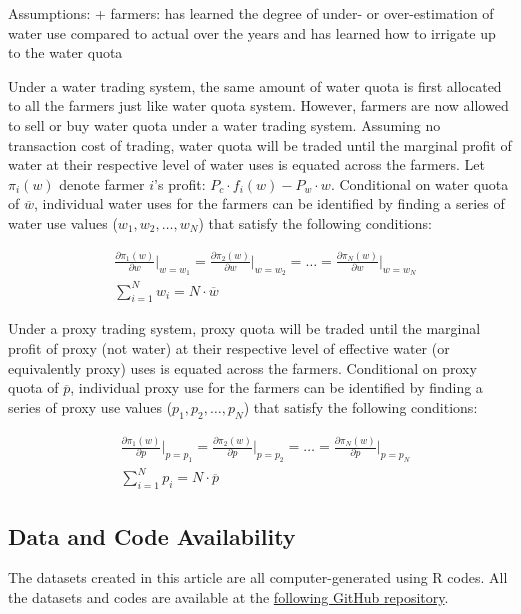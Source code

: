 \documentclass[
]{article}
\begin{document}
Assumptions:
+ farmers: has learned the degree of under- or over-estimation of water use compared to actual over the years and has learned how to irrigate up to the water quota

Under a water trading system, the same amount of water quota is first allocated to all the farmers just like water quota system. However, farmers are now allowed to sell or buy water quota under a water trading system. Assuming no transaction cost of trading, water quota will be traded until the marginal profit of water at their respective level of water uses is equated across the farmers. Let \(\pi_i(w)\) denote farmer \(i\)'s profit: \(P_c \cdot f_i(w) - P_w \cdot w\). Conditional on water quota of \(\overline{w}\), individual water uses for the farmers can be identified by finding a series of water use values (\(w_1, w_2, \dots, w_N\)) that satisfy the following conditions:

\begin{align}
& \frac{\partial \pi_1(w)}{\partial w}\Big\rvert_{w = w_1} = \frac{\partial \pi_2(w)}{\partial w}\Big\rvert_{w = w_2} = \dots = \frac{\partial \pi_N(w)}{\partial w}\Big\rvert_{w = w_N} \\
& \sum_{i=1}^N w_i = N \cdot \overline{w}
\end{align}

Under a proxy trading system, proxy quota will be traded until the marginal profit of proxy (not water) at their respective level of effective water (or equivalently proxy) uses is equated across the farmers. Conditional on proxy quota of \(\overline{p}\), individual proxy use for the farmers can be identified by finding a series of proxy use values (\(p_1, p_2, \dots, p_N\)) that satisfy the following conditions:

\begin{align}
& \frac{\partial \pi_1(w)}{\partial p}\Big\rvert_{p = p_1} = \frac{\partial \pi_2(w)}{\partial p}\Big\rvert_{p = p_2} = \dots = \frac{\partial \pi_N(w)}{\partial p}\Big\rvert_{p = p_N} \\
& \sum_{i=1}^N p_i = N \cdot \overline{p}
\end{align}

\subsection{Data and Code Availability}\label{data-and-code-availability}

The datasets created in this article are all computer-generated using R codes. All the datasets and codes are available at the \href{https://github.com/tmieno2/Measurement-Error-Water-Management}{following GitHub repository}.
\end{document}
